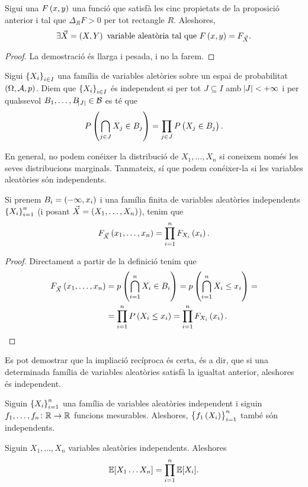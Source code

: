 \begin{prop}
    Sigui una $F\left( x,y\right)$ una funció que satisfà les cinc propietats de la proposició anterior i tal que $\Delta_RF>0$ per tot rectangle $R$. Aleshores,
    \[
        \exists \vec{X}=\left( X,Y\right) \text{ variable aleatòria tal que } F\left( x,y\right) = F_{\vec{X}}.
    \]
\end{prop}
\begin{proof}
    La demostració és llarga i pesada, i no la farem.
\end{proof}
\begin{defi}
    Sigui $\left\{ X_i\right\}_{i\in I}$ una família de variables aletòries sobre un espai de probabilitat $\left(\Omega,\mathcal{A},p\right)$. Diem que $\left\{ X_i\right\}_{i\in I}$ és independent si per tot $J\subseteq I$ amb $\abs{J}<+\infty$ i per qualssevol $B_1,\dots,B_{\abs{J}}\in\mathcal{B}$ es té que
    \[
        P\left(\bigcap_{j\in J}X_j\in B_j\right) = \prod_{j\in J} P\left( X_j\in B_j\right).
    \]
\end{defi}
En general, no podem conéixer la distribució de $X_1,\dots,X_n$ si coneixem només les seves distribucions marginals. Tanmateix, sí que podem conéixer-la si les variables aleatòries són independents.
\begin{prop}
    Si prenem $B_i=\left(-\infty,x_i\right)$ i una família finita de variables aleatòries independents $\left\{ X_i\right\}_{i=1}^n$ (i posant $\vec{X}=\left( X_1,\dots,X_n\right)$), tenim que
    \[
        F_{\vec{X}}\left( x_1,\dots,x_n\right) = \prod_{i=1}^n F_{X_i}\left( x_i\right).
    \]
\end{prop}
\begin{proof}
    Directament a partir de la definició tenim que
    \begin{align*}
        F_{\vec{X}}\left( x_1,\dots,x_n\right) &= p\left( \bigcap_{i=1}^n X_i\in B_i\right) =p\left( \bigcap_{i=1}^n X_i\leq x_i\right) =\\
        &= \prod_{i=1}^n P\left( X_i\leq x_i\right) = \prod_{i=1}^n F_{X_i}\left( x_i\right).
    \end{align*}
\end{proof}
\begin{obs}
    Es pot demostrar que la impliació recíproca és certa, és a dir, que si una determinada família de variables aleatòries satisfà la igualtat anterior, aleshores és independent.
\end{obs}
\begin{obs}
    Siguin $\left\{ X_i\right\}_{i=1}^n$ una família de variables aleatòries independent i siguin $f_1,\dots,f_n\colon \mathbb{R}\to\mathbb{R}$ funcions mesurables. Aleshores, $\left\{ f_1\left( X_i\right)\right\}_{i=1}^n$ també són independents.
\end{obs}
\begin{prop}
    Siguin $X_1, \dots, X_n$ variables aleatòries independents. Aleshores 
    \[
        \operatorname{\mathbb{E}}[X_1\dots X_n] = \prod \limits_{i=1}^n \operatorname{\mathbb{E}}[X_i].
    \]
\end{prop}

